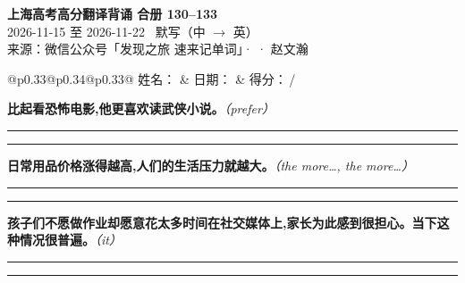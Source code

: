 \documentclass[11pt,a4paper]{article}
\newcommand{\num}[1]{\makebox[1.9em][r]{#1.}\hspace{0.3em}}
\newcommand{\wline}{\noindent\rule{\linewidth}{0.4pt}}
\newcommand{\prompt}[1]{\emph{\textcolor{tipblue}{\small（#1）}}}
\begin{document}
\pagestyle{plain}
\begin{center}
{\LARGE\bfseries 上海高考高分翻译背诵 \quad 合册 130–133}\\[0.25em]
{\large 2026-11-15 至 2026-11-22 \quad\ 默写（中 $\to$ 英）}\\[0.35em]
{\footnotesize 来源：微信公众号「发现之旅 速来记单词」·  · 赵文瀚}
\end{center}

\vspace{0.4em}
\noindent\begin{tabular}{@{}p{0.33\textwidth}@{}p{0.34\textwidth}@{}p{0.33\textwidth}@{}}
姓名：\underline{\hspace{2.0cm}} & 日期：\underline{\hspace{2.0cm}} & 得分：\underline{\hspace{1.4cm}}\,/ \\
\end{tabular}

\vspace{0.5em}

\vspace{0.8em}
\vspace{0.35em}\vspace{0.15em}

\begin{minipage}{\linewidth}

\num{1}\textbf{比起看恐怖电影,他更喜欢读武侠小说。}\prompt{prefer}

\vspace{0.3em}

\wline\vspace{0.3em}
\wline

\end{minipage}

\begin{minipage}{\linewidth}

\num{2}\textbf{日常用品价格涨得越高,人们的生活压力就越大。}\prompt{the more…, the more…}

\vspace{0.3em}

\wline\vspace{0.3em}
\wline

\end{minipage}

\begin{minipage}{\linewidth}

\num{3}\textbf{孩子们不愿做作业却愿意花太多时间在社交媒体上,家长为此感到很担心。当下这种情况很普遍。}\prompt{it}

\vspace{0.3em}

\wline\vspace{0.3em}
\wline

\end{minipage}
\end{document}
